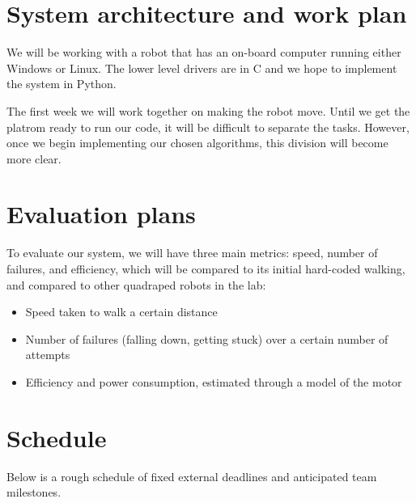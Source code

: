 \section{System architecture and work plan}

We will be working with a robot that has an on-board computer running
either Windows or Linux. The lower level drivers are in C and we hope
to implement the system in Python.

The first week we will work together on making the robot move. Until we get the platrom ready to run our code, it will be difficult to separate the tasks. However, once we begin implementing our chosen algorithms, this division will become more clear.



% 
% 
% 


\section{Evaluation plans}
\label{sec:evaluation}

To evaluate our system, we will have three main metrics: speed, number
of failures, and efficiency, which will be compared to its initial
hard-coded walking, and compared to other quadraped robots in the lab:

\begin{itemize}
\item Speed taken to walk a certain distance
\item Number of failures (falling down, getting stuck) over a certain number of attempts
\item Efficiency and power consumption, estimated through a model of the motor
\end{itemize}



\section{Schedule}

Below is a rough schedule of fixed external deadlines and anticipated
team milestones.

